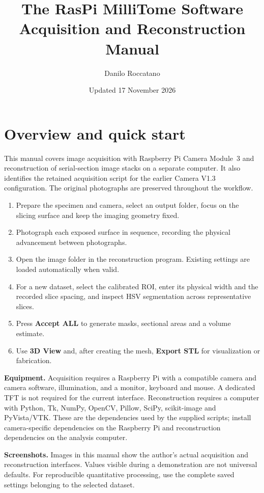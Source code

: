 \documentclass[11pt,a4paper]{article}
\title{The RasPi MilliTome Software\\\large Acquisition and Reconstruction Manual}
\author{Danilo Roccatano}
\date{Updated 17 November 2026}
\newcommand{\button}[1]{\textbf{#1}}
\begin{document}
\maketitle
\section{Overview and quick start}
This manual covers image acquisition with Raspberry Pi Camera Module~3 and reconstruction of serial-section image stacks on a separate computer. It also identifies the retained acquisition script for the earlier Camera V1.3 configuration. The original photographs are preserved throughout the workflow.

\begin{enumerate}
\item Prepare the specimen and camera, select an output folder, focus on the slicing surface and keep the imaging geometry fixed.
\item Photograph each exposed surface in sequence, recording the physical advancement between photographs.
\item Open the image folder in the reconstruction program. Existing  settings are loaded automatically when valid.
\item For a new dataset, select the calibrated ROI, enter its physical width and the recorded slice spacing, and inspect HSV segmentation across representative slices.
\item Press \button{Accept ALL} to generate masks, sectional areas and a volume estimate.
\item Use \button{3D View} and, after creating the mesh, \button{Export STL} for visualization or fabrication.
\end{enumerate}

\textbf{Equipment.} Acquisition requires a Raspberry Pi with a compatible camera and camera software, illumination, and a monitor, keyboard and mouse. A dedicated TFT is not required for the current interface. Reconstruction requires a computer with Python, Tk, NumPy, OpenCV, Pillow, SciPy, scikit-image and PyVista/VTK. These are the dependencies used by the supplied scripts; install camera-specific dependencies on the Raspberry Pi and reconstruction dependencies on the analysis computer.

\textbf{Screenshots.} Images in this manual show the author's actual acquisition and reconstruction interfaces. Values visible during a demonstration are not universal defaults. For reproducible quantitative processing, use the complete saved settings belonging to the selected dataset.
\end{document}
